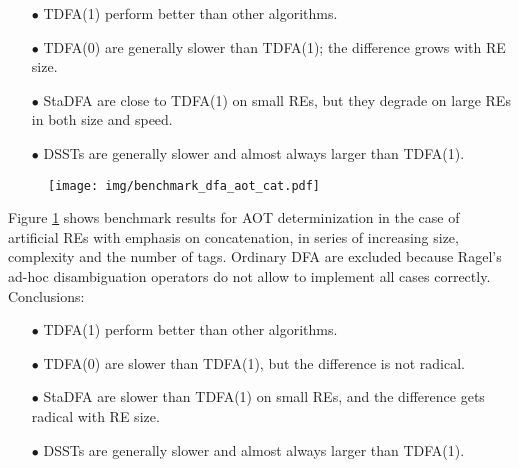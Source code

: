 \documentclass[]{article}
\begin{document}
\begin{itemize}

\item[$\bullet$]
TDFA(1) perform better than other algorithms.
\medskip

\item[$\bullet$]
TDFA(0) are generally slower than TDFA(1); the difference grows with RE size.
\medskip

\item[$\bullet$]
StaDFA are close to TDFA(1) on small REs, but they degrade on large REs in both size and speed.
\medskip

\item[$\bullet$]
DSSTs are generally slower and almost always larger than TDFA(1).

\end{itemize}

\pagebreak

\begin{figure}[t!]
\texttt{[image: img/benchmark\_dfa\_aot\_cat.pdf]}
\label{fig:benchmark_dfa_aot_cat}
\end{figure}

Figure \ref{fig:benchmark_dfa_aot_cat} shows benchmark results for AOT determinization
in the case of artificial REs with emphasis on concatenation, in series of increasing size, complexity and the number of tags.
Ordinary DFA are excluded because Ragel's ad-hoc disambiguation operators do not allow to implement all cases correctly.
Conclusions:
\medskip

\begin{itemize}

\item[$\bullet$]
TDFA(1) perform better than other algorithms.
\medskip

\item[$\bullet$]
TDFA(0) are slower than TDFA(1), but the difference is not radical.
\medskip

\item[$\bullet$]
StaDFA are slower than TDFA(1) on small REs, and the difference gets radical with RE size.
\medskip

\item[$\bullet$]
DSSTs are generally slower and almost always larger than TDFA(1).

\end{itemize}

\pagebreak
\end{document}
